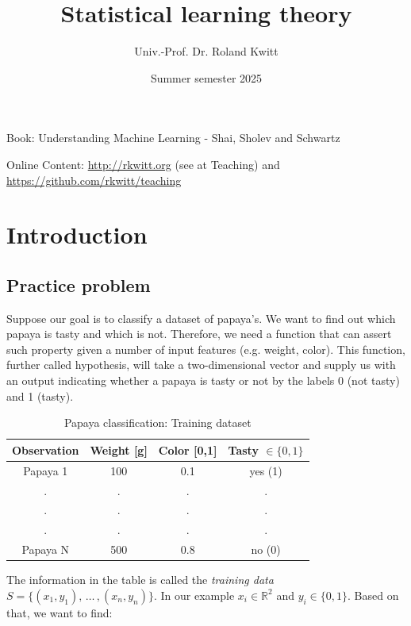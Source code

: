 \documentclass{scrarticle}
\title{Statistical learning theory}
\author{Univ.-Prof. Dr. Roland Kwitt}
\date{Summer semester 2025}
\begin{document}
\maketitle
\begin{center}
Book: Understanding Machine Learning - Shai, Sholev and Schwartz

\vspace{0cm}

Online Content: \url{http://rkwitt.org} (see at Teaching) and \url{https://github.com/rkwitt/teaching}
\end{center}




\section{Introduction}

\subsection{Practice problem}
Suppose our goal is to classify a dataset of papaya's. We want to find out which papaya is tasty and which is not. Therefore, we need a function that can assert such property given a number of input features (e.g. weight, color). This function, further called hypothesis, will take a two-dimensional vector and supply us with an output indicating whether a papaya is tasty or not by the labels 0 (not tasty) and 1 (tasty).

\begin{table}[ht]
    \centering
    \begin{tabular}{c|c|c||c}
         Observation &Weight [g]  &Color [0,1]  &Tasty $\in \{0,1\}$ \\
         \hline
         Papaya 1 &100  &0.1  &yes (1) \\
         . & . & . & . \\
         . & . & . & . \\
         . & . & . & . \\
         Papaya N&500  &0.8  &no (0) \\
    \end{tabular}
    \caption{Papaya classification: Training dataset}
    \label{tab:papaya}
\end{table}

The information in the table is called the \textit{training data} $S=\{(x_1, y_1),\, \ldots \, , (x_n, y_n)\}$. In our example $x_i \in \mathbb{R}^2$ and $y_i \in \{0,1\}$. Based on that, we want to find:
\end{document}
